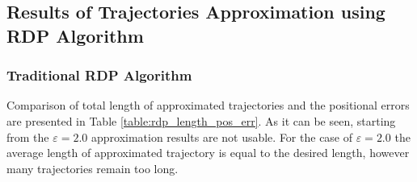 \subsection{Results of Trajectories Approximation using RDP Algorithm}

\subsubsection{Traditional RDP Algorithm}

Comparison of total length of approximated trajectories and the positional errors are presented in Table \ref{table:rdp_length_pos_err}. As it can be seen, starting from the $\varepsilon = 2.0$ approximation results are not usable. For the case of $\varepsilon = 2.0$ the average length of approximated trajectory is equal to the desired length, however many trajectories remain too long.

